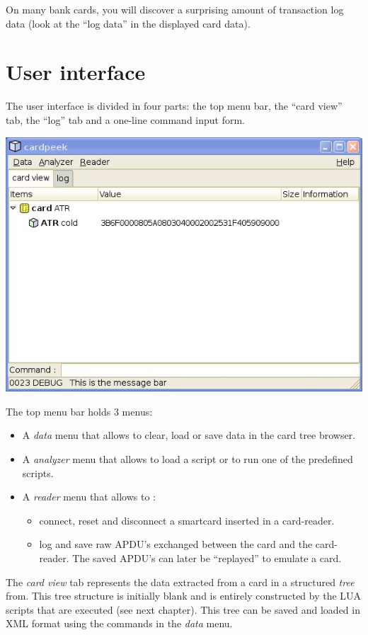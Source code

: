 \documentclass[11pt]{report}
\begin{document}
On many bank cards, you will discover a surprising amount of transaction log data (look at the ``log data'' 
in the displayed card data).

\section{User interface}

The user interface is divided in four parts: the top menu bar, the ``card view'' tab, the ``log'' tab and 
a one-line command input form.

\begin{center}
\includegraphics[width=.75\textwidth]{graphics/sample-blank.jpg}
\end{center}

The top menu bar holds 3 menus:
\begin{itemize}
\item{A \emph{data} menu that allows to clear, load or save data in the card tree browser.}  
\item{A \emph{analyzer} menu that allows to load a script or to run one of the predefined scripts.}
\item{A \emph{reader} menu that allows to :
  \begin{itemize} 
  \item{connect, reset and disconnect a smartcard inserted in a card-reader.}
  \item{log and save raw APDU's exchanged between the card and the card-reader. 
	The saved APDU's can later be ``replayed'' to emulate a card.}
  \end{itemize}}
\end{itemize}

The \emph{card view} tab represents the data extracted from a card in a structured \emph{tree} from.
This tree structure is initially blank and is entirely constructed by the LUA scripts that are executed (see next chapter).
This tree can be saved and loaded in XML format using the commands in the \emph{data} menu.
\end{document}
